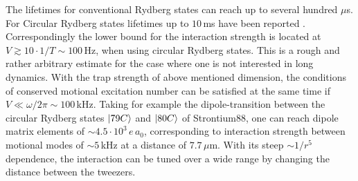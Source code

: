 The lifetimes for conventional Rydberg states can reach up to several hundred $\mu$s. For Circular Rydberg states lifetimes up to $10\,$ms have been reported \cite{pultineviciusLonglivedGiantCircular2026}.  Correspondingly the lower bound for the interaction strength is located at $V\gtrsim10\cdot1/T\sim100\,$Hz, when using circular Rydberg states. This is a rough and rather arbitrary estimate for the case where one is not interested in long dynamics. With the trap strength of above mentioned dimension, the conditions of conserved motional excitation number can be satisfied at the same time if $V\ll\omega/2\pi\sim100\,$kHz.
Taking for example the dipole-transition between the circular Rydberg states $\ket{79C}$ and $\ket{80C}$ of Strontium88, one can reach dipole matrix elements of $\sim4.5\cdot10^3\,e\,a_0$, corresponding to interaction strength between motional modes of $\sim5\,$kHz at a distance of $7.7\,\mu$m. With its steep $\sim1/r^5$ dependence, the interaction can be tuned over a wide range by changing the distance between the tweezers.


